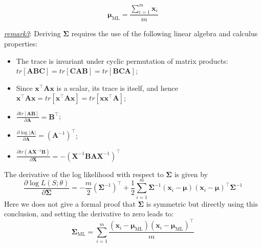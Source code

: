 \documentclass{article}
\begin{document}
\begin{itemize}
	\begin{equation}
	\bm{\mu}_{\mathrm{ML}}= \frac{\sum_{i=1}^m \bm{x}_i}{m}
	\end{equation}

	\begin{footnotesize}
	\textit{\underline{remark3}}: Deriving $\bm{\Sigma}$ requires the use of the following linear algebra and calculus properties:	
	\begin{itemize}
	\item The trace is invariant under cyclic permutation of matrix products: $tr[\bm{A}\bm{B}\bm{C}]=tr[\bm{C}\bm{A}\bm{B}]=tr[\bm{B}\bm{C}\bm{A}]$;
	\item Since $\bm{x}^\top \bm{A} \bm{x}$ is a scalar, its trace is itself, and hence $\bm{x}^\top \bm{A} \bm{x} = tr[\bm{x}^\top \bm{A} \bm{x}] = tr[\bm{x} \bm{x}^\top \bm{A}]$;
	\item $\frac{\partial tr[\bm{A} \bm{B}]}{\partial \bm{A}} = \bm{B}^\top$;
	\item $\frac{\partial \log |\bm{A}|}{\partial \bm{A}} = (\bm{A}^{-1})^\top$;
	\item $\frac{\partial tr(\bm{A}\bm{X}^{-1}\bm{B})}{\partial \bm{X}} = -(\bm{X}^{-1} \bm{BA}\bm{X}^{-1})^\top$
	\end{itemize}
	\end{footnotesize}
	The derivative of the log likelihood with respect to $\bm{\Sigma}$ is given by
	\begin{equation*}
	\frac{\partial \log L(S;\theta)}{\partial \bm{\Sigma}} = -\frac{m}{2} (\bm{\Sigma}^{-1})^\top + \frac{1}{2} \sum_{i=1}^m  \bm{\Sigma}^{-1} (\bm{x}_i - \bm{\mu})(\bm{x}_i - \bm{\mu})^\top \bm{\Sigma}^{-1}
	\end{equation*}
Here we does not give a formal proof that $\bm{\Sigma}$ is symmetric but directly using this conclusion, and setting the derivative to zero leads to:
	\begin{equation}
	\bm{\Sigma}_{\mathrm{ML}} = \sum_{i=1}^m \frac{(\bm{x}_i - \bm{\mu}_{\mathrm{ML}})(\bm{x}_i - \bm{\mu}_{\mathrm{ML}})^\top}{m}
	\end{equation}
	

\end{itemize}
\end{document}
